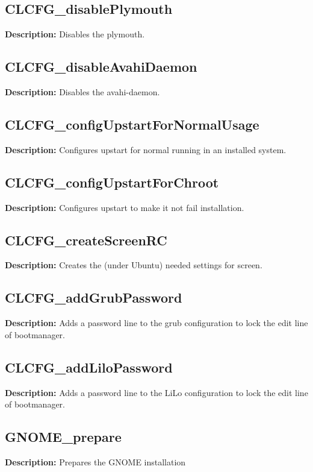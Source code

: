 \subsection{CLCFG\_disablePlymouth}
\textbf{Description:} Disables the plymouth.\\

\subsection{CLCFG\_disableAvahiDaemon}
\textbf{Description:} Disables the avahi-daemon.\\

\subsection{CLCFG\_configUpstartForNormalUsage}
\textbf{Description:} Configures upstart for normal running in an installed system.\\

\subsection{CLCFG\_configUpstartForChroot}
\textbf{Description:} Configures upstart to make it not fail installation.\\

\subsection{CLCFG\_createScreenRC}
\textbf{Description:} Creates the (under Ubuntu) needed settings for screen.\\

\subsection{CLCFG\_addGrubPassword}
\textbf{Description:} Adds a password line to the grub configuration to lock the edit line of bootmanager.\\

\subsection{CLCFG\_addLiloPassword}
\textbf{Description:} Adds a password line to the LiLo configuration to lock the edit line of bootmanager.\\

\subsection{GNOME\_prepare}
\textbf{Description:} Prepares the GNOME installation\\

